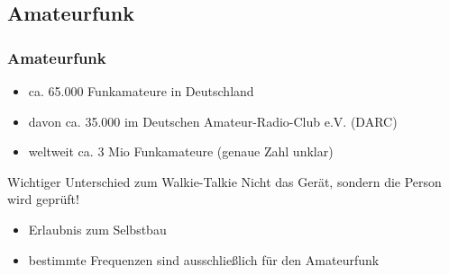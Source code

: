 \begin{frame}
\begin{columns}[c]
\begin{center}
            \tiny \hyperlink{refs}{\cite{meph}}
        \end{center}
        \column{6.5cm}
    \end{columns}

\end{frame}

\subsection{Amateurfunk}

\begin{frame}
  \frametitle{Amateurfunk}

  \begin{itemize}
    \item ca. 65.000 Funkamateure in Deutschland
    \item davon ca. 35.000 im Deutschen Amateur-Radio-Club e.V. (DARC)
    \item weltweit ca. 3 Mio Funkamateure (genaue Zahl unklar)
  \end{itemize}

  \begin{exampleblock}{Wichtiger Unterschied zum Walkie-Talkie}
    Nicht das Gerät, sondern die Person wird geprüft!
  \end{exampleblock}

  \begin{itemize}
    \item Erlaubnis zum Selbstbau
    \item bestimmte Frequenzen sind ausschließlich für den Amateurfunk
  \end{itemize}
\end{frame}

